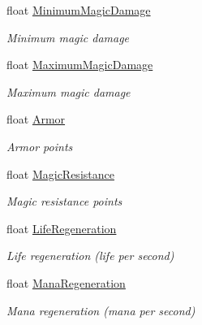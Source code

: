\begin{DoxyCompactItemize}
float \hyperlink{class_hel_project_1_1_features_1_1_feature_collection_a63883eb7a9cf40645502d92e722e7bf3}{Minimum\+Magic\+Damage}
\begin{DoxyCompactList}\small\item\em Minimum magic damage \end{DoxyCompactList}\item 
float \hyperlink{class_hel_project_1_1_features_1_1_feature_collection_a231d947a27b442bfedb8b768e62b0984}{Maximum\+Magic\+Damage}
\begin{DoxyCompactList}\small\item\em Maximum magic damage \end{DoxyCompactList}\item 
float \hyperlink{class_hel_project_1_1_features_1_1_feature_collection_a5485b8d9e8d3f4773c4599c66c22c11c}{Armor}
\begin{DoxyCompactList}\small\item\em Armor points \end{DoxyCompactList}\item 
float \hyperlink{class_hel_project_1_1_features_1_1_feature_collection_a75958bd28bcc931507fe4186a8fa93f0}{Magic\+Resistance}
\begin{DoxyCompactList}\small\item\em Magic resistance points \end{DoxyCompactList}\item 
float \hyperlink{class_hel_project_1_1_features_1_1_feature_collection_a8be9097e1627878b3a2d9719e07bf4bc}{Life\+Regeneration}
\begin{DoxyCompactList}\small\item\em Life regeneration (life per second) \end{DoxyCompactList}\item 
float \hyperlink{class_hel_project_1_1_features_1_1_feature_collection_a1fca3d022c8171a1d0f20364cac6ba8a}{Mana\+Regeneration}
\begin{DoxyCompactList}\small\item\em Mana regeneration (mana per second) \end{DoxyCompactList}\item 

\end{DoxyCompactItemize}
